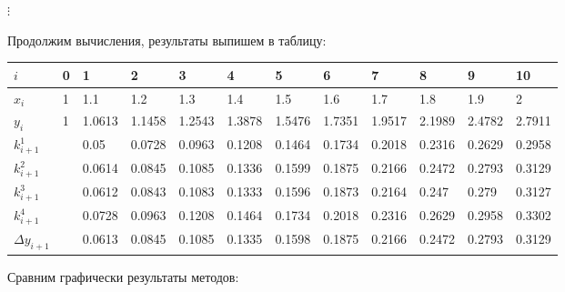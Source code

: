 \documentclass[10pt, a4paper]{scrartcl}
\begin{document}
\(\displaystyle \vdots\)

\vspace{5mm}

Продолжим вычисления, результаты выпишем в таблицу:

\begin{center}
\begin{tabular}{ | l  | l  | l  | l  | l  | l  | l  | l  | l  | l  | l  | l |}
\hline
$i$ & 0 & 1 & 2 & 3 & 4 & 5 & 6 & 7 & 8 & 9 & 10 \\ \hline
$x_i$ & 1 & 1.1 & 1.2 & 1.3 & 1.4 & 1.5 & 1.6 & 1.7 & 1.8 & 1.9 & 2 \\ \hline
$y_i$ & 1 & 1.0613 & 1.1458 & 1.2543 & 1.3878 & 1.5476 & 1.7351 & 1.9517 & 2.1989 & 2.4782 & 2.7911 \\ \hline
$k^1_{i+1}$ &  & 0.05 & 0.0728 & 0.0963 & 0.1208 & 0.1464 & 0.1734 & 0.2018 & 0.2316 & 0.2629 & 0.2958 \\ \hline
$k^2_{i+1}$ &  & 0.0614 & 0.0845 & 0.1085 & 0.1336 & 0.1599 & 0.1875 & 0.2166 & 0.2472 & 0.2793 & 0.3129 \\ \hline
$k^3_{i+1}$ &  & 0.0612 & 0.0843 & 0.1083 & 0.1333 & 0.1596 & 0.1873 & 0.2164 & 0.247 & 0.279 & 0.3127 \\ \hline
$k^4_{i+1}$ &  & 0.0728 & 0.0963 & 0.1208 & 0.1464 & 0.1734 & 0.2018 & 0.2316 & 0.2629 & 0.2958 & 0.3302 \\ \hline
$\Delta y_{i+1}$ &  & 0.0613 & 0.0845 & 0.1085 & 0.1335 & 0.1598 & 0.1875 & 0.2166 & 0.2472 & 0.2793 & 0.3129 \\ \hline
\end{tabular}
\end{center}

\vspace{5mm}

Сравним графически результаты методов:
\end{document}
